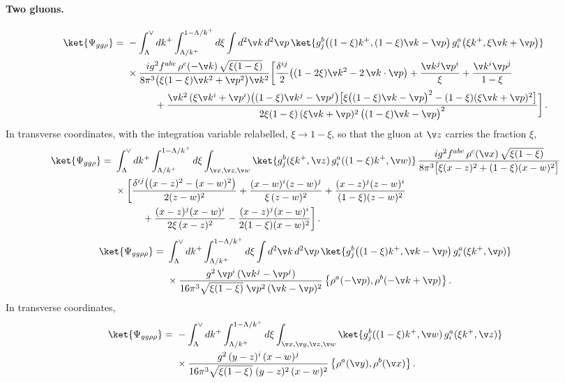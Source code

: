 \paragraph{Two gluons.}
\begin{align}\label{psiggrhomomre}
\ket{\Psi_{gg\rho}} =\ &-\int_{\Lambda}^{\vee}dk^{+}\int_{\Lambda/k^{+}}^{1-\Lambda/k^{+}}d\xi\int d^{2}\v k\,d^{2}\v p\,
\ket{g^{b}_{j}\big((1-\xi)k^{+},(1-\xi)\v k-\v p\big)\,g^{a}_{i}\big(\xi k^{+},\xi\v k+\v p\big)}\notag\\
&\times\frac{ig^{2}f^{abc}\,\rho^{c}(-\v k)\,\sqrt{\xi(1-\xi)}}{8\pi^{3}\big(\xi(1-\xi)\v k^{2}+\v p^{2}\big)\v k^{2}}
\bigg[\frac{\delta^{ij}}{2}\big((1-2\xi)\v k^{2}-2\,\v k\cdot\v p\big)+\frac{\v k^{j}\v p^{i}}{\xi}+\frac{\v k^{i}\v p^{j}}{1-\xi}\notag\\
&\hspace{1cm}+\frac{\v k^{2}\,(\xi\v k^{i}+\v p^{i})\big((1-\xi)\v k^{j}-\v p^{j}\big)
\big[\xi\big((1-\xi)\v k-\v p\big)^{2}-(1-\xi)(\xi\v k+\v p)^{2}\big]}
{2\xi(1-\xi)\,(\xi\v k+\v p)^{2}\,\big((1-\xi)\v k-\v p\big)^{2}}\bigg]\,.
\end{align}
In transverse coordinates, with the integration variable relabelled, $\xi\to1-\xi$, so that the gluon at
$\v z$ carries the fraction $\xi$,
\begin{align}\label{ggrhopos}
\ket{\Psi_{gg\rho}} =\ &\int_{\Lambda}^{\vee}dk^{+}\int_{\Lambda/k^{+}}^{1-\Lambda/k^{+}}d\xi\int_{\v x,\v z,\v w}
\ket{g^{b}_{j}(\xi k^{+},\v z)\,g^{a}_{i}((1-\xi)k^{+},\v w)}\,
\frac{ig^{2}f^{abc}\,\rho^{c}(\v x)\,\sqrt{\xi(1-\xi)}}{8\pi^{3}\big[\xi(x-z)^{2}+(1-\xi)(x-w)^{2}\big]}\notag\\
&\times\bigg[\frac{\delta^{ij}\big((x-z)^{2}-(x-w)^{2}\big)}{2(z-w)^{2}}+\frac{(x-w)^{i}(z-w)^{j}}{\xi\,(z-w)^{2}}
+\frac{(x-z)^{j}(z-w)^{i}}{(1-\xi)(z-w)^{2}}\notag\\
&\hspace{1cm}+\frac{(x-z)^{j}(x-w)^{i}}{2\xi\,(x-z)^{2}}-\frac{(x-z)^{j}(x-w)^{i}}{2(1-\xi)(x-w)^{2}}\bigg]\,.
\end{align}
\begin{align}\label{ggrhorhomom}
\ket{\Psi_{gg\rho\rho}} =\ &\int_{\Lambda}^{\vee}dk^{+}\int_{\Lambda/k^{+}}^{1-\Lambda/k^{+}}d\xi\int d^{2}\v k\,d^{2}\v p\,
\ket{g^{b}_{j}\big((1-\xi)k^{+},\v k-\v p\big)\,g^{a}_{i}(\xi k^{+},\v p)}\notag\\
&\times\frac{g^{2}\,\v p^{i}\,(\v k^{j}-\v p^{j})}{16\pi^{3}\sqrt{\xi(1-\xi)}\;\v p^{2}\,(\v k-\v p)^{2}}\,
\big\{\rho^{a}(-\v p),\rho^{b}(-\v k+\v p)\big\}\,.
\end{align}
In transverse coordinates,
\begin{align}\label{ggrhorhopos}
\ket{\Psi_{gg\rho\rho}} =\ &-\int_{\Lambda}^{\vee}dk^{+}\int_{\Lambda/k^{+}}^{1-\Lambda/k^{+}}d\xi\int_{\v x,\v y,\v z,\v w}
\ket{g^{b}_{j}((1-\xi)k^{+},\v w)\,g^{a}_{i}(\xi k^{+},\v z)}\notag\\
&\times\frac{g^{2}\,(y-z)^{i}\,(x-w)^{j}}{16\pi^{3}\sqrt{\xi(1-\xi)}\;(y-z)^{2}\,(x-w)^{2}}\,
\big\{\rho^{a}(\v y),\rho^{b}(\v x)\big\}\,.
\end{align}

